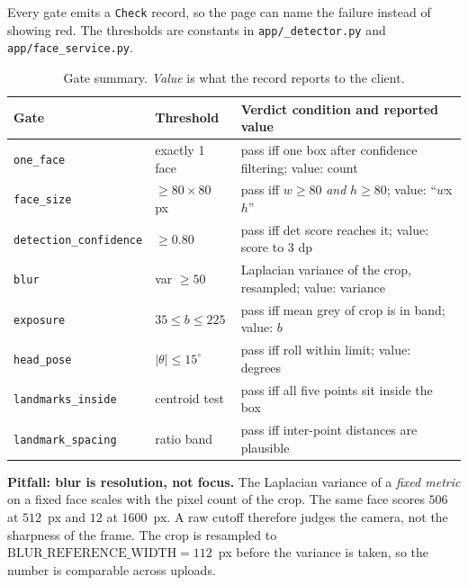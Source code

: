 \documentclass[11pt,a4paper]{article}
\newcommand{\coden}[1]{\texttt{\small #1}}
\begin{document}
Every gate emits a \coden{Check} record, so the page can name the failure
instead of showing red. The thresholds are constants in
\coden{app/\_detector.py} and \coden{app/face\_service.py}.

\begin{table}[H]
\centering
\caption{Gate summary. \emph{Value} is what the record reports to the client.}
\label{tab:gates}
\renewcommand{\arraystretch}{1.3}
\begin{tabularx}{\linewidth}{@{}l l X@{}}
\toprule
\textbf{Gate} & \textbf{Threshold} & \textbf{Verdict condition and reported value} \\
\midrule
\coden{one\_face}              & exactly 1 face          & pass iff one box after confidence filtering; value: count \\
\coden{face\_size}             & $\ge 80\times 80$ px     & pass iff $w\ge 80$ \emph{and} $h\ge 80$; value: ``$w$x$h$'' \\
\coden{detection\_confidence}  & $\ge 0.80$              & pass iff det score reaches it; value: score to 3 dp \\
\coden{blur}                   & var $\ge 50$            & Laplacian variance of the crop, resampled; value: variance \\
\coden{exposure}               & $35 \le b \le 225$       & pass iff mean grey of crop is in band; value: $b$ \\
\coden{head\_pose}             & $|\theta| \le 15^\circ$  & pass iff roll within limit; value: degrees \\
\coden{landmarks\_inside}       & centroid test           & pass iff all five points sit inside the box \\
\coden{landmark\_spacing}       & ratio band              & pass iff inter-point distances are plausible \\
\bottomrule
\end{tabularx}
\end{table}

\begin{warnbox}
\textbf{Pitfall: blur is resolution, not focus.} The Laplacian variance
of a \emph{fixed metric} on a fixed face scales with the pixel count of
the crop. The same face scores $506$ at $512$~px and $12$ at $1600$~px.
A raw cutoff therefore judges the camera, not the sharpness of the
frame. The crop is resampled to
$\mathrm{BLUR\_REFERENCE\_WIDTH}=112$~px before the variance is taken,
so the number is comparable across uploads.
\end{warnbox}
\end{document}
